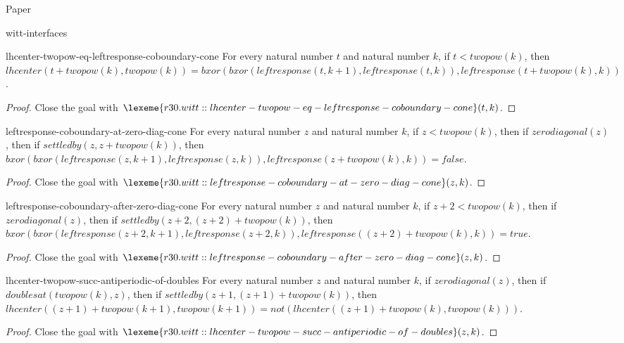 \begin{lexlean}{Paper}
\begin{section}{witt-interfaces}
  \begin{theorem}{lhcenter-twopow-eq-leftresponse-coboundary-cone}
  For every natural number \(t\) and natural number \(k\), if \(t < twopow(k)\), then \(lhcenter(t + twopow(k), twopow(k)) = bxor(bxor(leftresponse(t, k + 1), leftresponse(t, k)), leftresponse(t + twopow(k), k))\).
  \begin{proof}
  Close the goal with \(\lexeme{r30.witt::lhcenter-twopow-eq-leftresponse-coboundary-cone}(t, k)\).
  \end{proof}
  \end{theorem}

  \begin{theorem}{leftresponse-coboundary-at-zero-diag-cone}
  For every natural number \(z\) and natural number \(k\), if \(z < twopow(k)\), then if \(zerodiagonal(z)\), then if \(settledby(z, z + twopow(k))\), then \(bxor(bxor(leftresponse(z, k + 1), leftresponse(z, k)), leftresponse(z + twopow(k), k)) = false\).
  \begin{proof}
  Close the goal with \(\lexeme{r30.witt::leftresponse-coboundary-at-zero-diag-cone}(z, k)\).
  \end{proof}
  \end{theorem}

  \begin{theorem}{leftresponse-coboundary-after-zero-diag-cone}
  For every natural number \(z\) and natural number \(k\), if \(z + 2 < twopow(k)\), then if \(zerodiagonal(z)\), then if \(settledby(z + 2, (z + 2) + twopow(k))\), then \(bxor(bxor(leftresponse(z + 2, k + 1), leftresponse(z + 2, k)), leftresponse((z + 2) + twopow(k), k)) = true\).
  \begin{proof}
  Close the goal with \(\lexeme{r30.witt::leftresponse-coboundary-after-zero-diag-cone}(z, k)\).
  \end{proof}
  \end{theorem}

  \begin{theorem}{lhcenter-twopow-succ-antiperiodic-of-doubles}
  For every natural number \(z\) and natural number \(k\), if \(zerodiagonal(z)\), then if \(doublesat(twopow(k), z)\), then if \(settledby(z + 1, (z + 1) + twopow(k))\), then \(lhcenter((z + 1) + twopow(k + 1), twopow(k + 1)) = not(lhcenter((z + 1) + twopow(k), twopow(k)))\).
  \begin{proof}
  Close the goal with \(\lexeme{r30.witt::lhcenter-twopow-succ-antiperiodic-of-doubles}(z, k)\).
  \end{proof}
  \end{theorem}


\end{section}
\end{lexlean}
